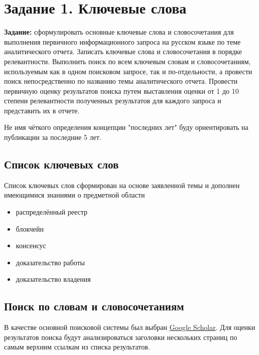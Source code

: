 \documentclass[a4paper, 12pt]{report}		%
\begin{document}
\tableofcontents

\chapter*{Задание 1. Ключевые слова}

\textbf{Задание:} сформулировать основные ключевые слова и словосочетания для выполнения первичного информационного запроса на русском языке по теме аналитического отчета. Записать ключевые слова и словосочетания в порядке релевантности. Выполнить поиск по всем ключевым словам и словосочетаниям, используемым как в одном поисковом запросе, так и по-отдельности, а провести поиск непосредственно по названию темы аналитического отчета. Провести первичную оценку результатов поиска путем выставления оценки от 1 до 10 степени релевантности полученных результатов для каждого запроса и представить их в отчете.

Не имя чёткого определения концепции "последних лет" буду ориентировать на публикации за последние 5 лет.

\section*{Список ключевых слов}

Список ключевых слов сформирован на основе заявленной темы и дополнен имеющимися знаниями о предметной области
\begin{itemize}
\item распределённый реестр
\item блокчейн
\item консенсус
\item доказательство работы
\item доказательство владения
\end{itemize}

\section*{Поиск по словам и словосочетаниям}

В качестве основной поисковой системы был выбран \href{https://scholar.google.com/}{Google Scholar}. Для оценки результатов поиска будут анализироваться заголовки нескольких страниц по самым верхним ссылкам из списка результатов.
\end{document}
